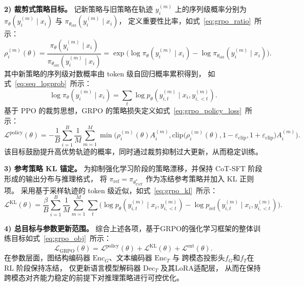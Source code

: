 \textbf{2) 裁剪式策略目标。}
记新策略与旧策略在轨迹 $y_i^{(m)}$ 上的序列级概率分别为
$\pi_{\theta}(y_i^{(m)}\mid x_i)$ 与 $\pi_{\theta_{\mathrm{old}}}(y_i^{(m)}\mid x_i)$，
定义重要性比率，如式~\ref{eq:grpo_ratio}\ 所示：
\begin{equation}
  \rho_i^{(m)}(\theta)=
  \frac{\pi_{\theta}(y_i^{(m)}\mid x_i)}{\pi_{\theta_{\mathrm{old}}}(y_i^{(m)}\mid x_i)}
  =
  \exp\!\Big(
    \log \pi_{\theta}(y_i^{(m)}\mid x_i)
    -
    \log \pi_{\theta_{\mathrm{old}}}(y_i^{(m)}\mid x_i)
  \Big).
  \label{eq:grpo_ratio}
\end{equation}
其中新策略的序列级对数概率由 token 级自回归概率累积得到，
如式~\ref{eq:seq_logprob}\ 所示：
\begin{equation}
  \log \pi_{\theta}(y_i^{(m)}\mid x_i)=\sum_t \log p_{\theta}\!\left(y_{i,t}^{(m)}\mid x_i, y_{i,<t}^{(m)}\right).
  \label{eq:seq_logprob}
\end{equation}
基于 PPO 的裁剪思想，GRPO 的策略损失定义如式~\ref{eq:grpo_policy_loss}\ 所示：
\begin{equation}
  \mathcal{L}^{\mathrm{policy}}(\theta)=
  -\frac{1}{B}\sum_{i=1}^{B}\frac{1}{M}\sum_{m=1}^{M}
  \min\!\Big(
    \rho_i^{(m)}(\theta)A_i^{(m)},
    \mathrm{clip}\big(\rho_i^{(m)}(\theta),1-\varepsilon_{\mathrm{clip}},1+\varepsilon_{\mathrm{clip}}\big)A_i^{(m)}
  \Big).
  \label{eq:grpo_policy_loss}
\end{equation}
该目标鼓励提升高优势轨迹的概率，同时通过裁剪抑制过大更新，从而稳定训练。

\textbf{3) 参考策略 KL 锚定。}
为抑制强化学习阶段的策略漂移，并保持 CoT-SFT 阶段形成的输出分布与推理格式，
将 $\pi_{\mathrm{ref}}=\pi_{\theta_{\mathrm{CoT}}^\ast}$ 
作为冻结参考策略并加入 KL 正则项。
采用基于采样轨迹的 token 级近似，如式~\ref{eq:grpo_kl}\ 所示：
\begin{equation}
  \mathcal{L}^{\mathrm{KL}}(\theta)=
  \frac{\beta}{B}\sum_{i=1}^{B}\frac{1}{M}\sum_{m=1}^{M}
  \sum_t \Big(
    \log p_{\theta}(y_{i,t}^{(m)}\mid x_i,y_{i,<t}^{(m)})
    -
    \log p_{\mathrm{ref}}(y_{i,t}^{(m)}\mid x_i,y_{i,<t}^{(m)})
  \Big).
  \label{eq:grpo_kl}
\end{equation}


\textbf{4) 总目标与参数更新范围。}
综合上述各项，基于GRPO的强化学习框架的整体训练目标如式~\ref{eq:grpo_obj}\ 所示：
\begin{equation}
  \mathcal{L}_{\mathrm{GRPO}}(\theta)=
  \mathcal{L}^{\mathrm{policy}}(\theta)+\mathcal{L}^{\mathrm{KL}}(\theta)+\mathcal{L}^{\mathrm{ent}}(\theta).
  \label{eq:grpo_obj}
\end{equation}
在参数层面，图结构编码器 $\mathrm{Enc}_G$、文本编码器 $\mathrm{Enc}_T$ 与
跨模态投影头\(f_G\)和\(f_T\)在 RL 阶段保持冻结，
仅更新语言模型解码器 $\mathrm{Dec}_T$ 及其LoRA适配层，
从而在保持跨模态对齐能力稳定的前提下对推理策略进行可控优化。


